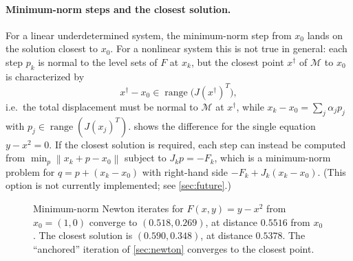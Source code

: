 \documentclass[11pt]{article}
\newcommand{\norm}[1]{\left\lVert #1 \right\rVert}
\DeclareMathOperator{\range}{range}
\begin{document}
\paragraph{Minimum-norm steps and the closest solution.}
For a linear underdetermined system, the minimum-norm step from $x_0$ lands on the solution
closest to $x_0$. For a nonlinear system this is not true in general: each step $p_k$ is normal
to the level sets of $F$ at $x_k$, but the closest point $x^\dagger$ of $\mathcal{M}$ to $x_0$ is
characterized by
\begin{equation}
  x^\dagger - x_0 \in \range\!\big(J(x^\dagger)^T\big),
  \label{eq:closest}
\end{equation}
i.e.\ the total displacement must be normal to $\mathcal{M}$ at $x^\dagger$, while
$x_k - x_0 = \sum_j \alpha_j p_j$ with $p_j \in \range(J(x_j)^T)$.  shows the
difference for the single equation $y - x^2 = 0$. If the closest solution is required, each step
can instead be computed from
$\min_p \norm{x_k + p - x_0}$ subject to $J_k p = -F_k$, which is a minimum-norm problem for
$q = p + (x_k - x_0)$ with right-hand side $-F_k + J_k (x_k - x_0)$. (This option is not
currently implemented; see \cref{sec:future}.)

\begin{figure}[htbp]
\centering
{}
\caption{Minimum-norm Newton iterates for $F(x,y) = y - x^2$ from $x_0 = (1,0)$ converge to
$(0.518, 0.269)$, at distance $0.5516$ from $x_0$. The closest solution is $(0.590, 0.348)$, at
distance $0.5378$. The ``anchored'' iteration of \cref{sec:newton} converges to the closest point.}
\label{fig:parabola}
\end{figure}
\end{document}
